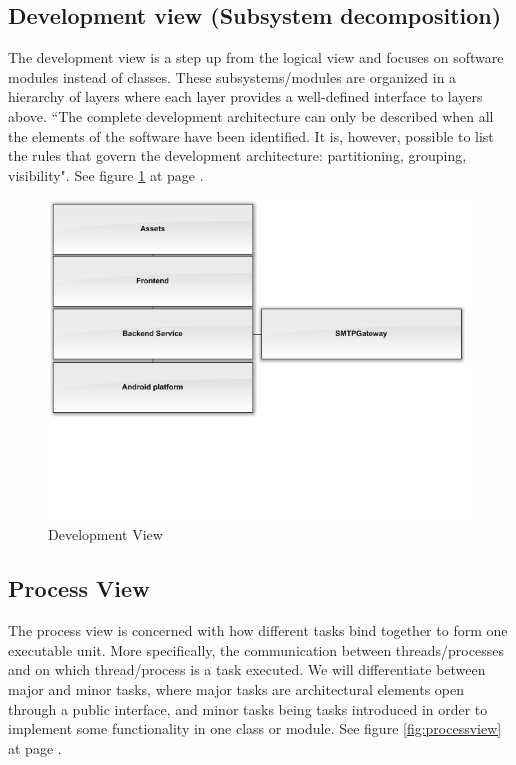 \subsection{Development view (Subsystem decomposition)}
The development view is a step up from the logical view and focuses on software modules instead of classes. These subsystems/modules are organized in a hierarchy of layers where each layer provides a well-defined interface to layers above. “The complete development architecture can only be described when all the elements of the software have been identified. It is, however, possible to list the rules that govern the development architecture: partitioning, grouping, visibility"\cite{bib:vm}.
See figure \ref{fig:developmentview} at page \pageref{fig:developmentview}.

\begin{figure}
	\includegraphics[width=\textwidth]{developmentview.png}
	\caption{Development View}
	\label{fig:developmentview}
\end{figure}

\subsection{Process View}
The process view is concerned with how different tasks bind together to form one executable unit. More specifically, the communication between threads/processes and on which thread/process is a task executed. We will differentiate between major and minor tasks, where major tasks are architectural elements open through a public interface, and minor tasks being tasks introduced in order to implement some functionality in one class or module.
See figure \ref{fig:processview} at page \pageref{fig:processview}.

